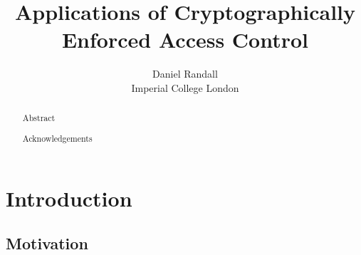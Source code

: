 \documentclass[12pt, titlepage]{article}
\title{Applications of Cryptographically Enforced Access Control}
\author{Daniel Randall \\ Imperial College London}
\date{}
\begin{document}
\maketitle

\begin{abstract}
Abstract
\end{abstract}

\renewcommand{\abstractname}{Acknowledgements}
\begin{abstract}
Acknowledgements
\end{abstract}

\makeatletter
  \renewcommand\paragraph{\@startsection{paragraph}{4}{\z@}
    {-3.25ex\@plus -1ex \@minus -.2ex}
    {1.5ex \@plus .2ex}
    {\normalfont\normalsize\bfseries}}
\makeatother


\newpage
\tableofcontents
\newpage

\newcommand{\defeq}{\stackrel{\textup{\tiny def}}{=}}

\section{Introduction}

\subsection{Motivation}
\end{document}

